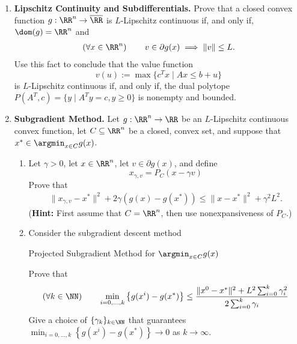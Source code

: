 \documentclass[11pt]{article}
\begin{document}
\begin{enumerate}
\begin{enumerate}
\end{enumerate}
\item \textbf{Lipschitz Continuity and Subdifferentials.} Prove that a closed convex function $g : \RR^n \rightarrow \overline{\RR}$ is $L$-Lipschitz continuous if, and only if, $\dom(g) = \RR^n$ and 
\begin{align*}
\left(\forall x \in \RR^n\right)  \qquad v \in \partial g(x) \implies \|v\| \leq L.
\end{align*}
Use this fact to conclude that the value function 
$$
v(u) := \max\{c^Tx \mid Ax \leq b + u\} 
$$
is $L$-Lipschitz continuous if, and only if, the dual polytope $P(A^T, c) = \{y \mid A^Ty = c, y \geq 0\}$ is nonempty and bounded. 
\item  \textbf{Subgradient Method.} Let $g : \RR^n \rightarrow \RR$ be an $L$-Lipschitz continuous convex function, let $C \subseteq \RR^n$ be a closed, convex set, and suppose that $x^\ast \in \argmin_{x \in C} g(x)$.
\begin{enumerate}
\item Let $\gamma > 0$, let $x \in \RR^n$, let $v \in \partial g(x)$, and define
$$
x_{\gamma, v} = P_C(x - \gamma v)
$$
Prove that 
\begin{align*}
\|x_{\gamma, v} - x^\ast\|^2 + 2\gamma(g(x) - g(x^\ast))  \leq \|x - x^\ast\|^2 + \gamma^2L^2.
\end{align*}
(\textbf{Hint:} First assume that $C = \RR^n$, then use nonexpansiveness of $P_C$.)
\item Consider the subgradient descent method
    \begin{algorithm}[H]
  \caption{Projected Subgradient Method for $\argmin_{x \in C} g(x)$
    \label{alg:altmin}}
  \begin{algorithmic}[1]
    \Loop
    \EndLoop
  \end{algorithmic}
\end{algorithm}
Prove that 
\begin{align*}
\left(\forall k \in \NN \right) \qquad \min_{i=0, \ldots, k} \left\{g(x^i) - g(x^\ast)\right\} \leq \frac{\|x^0 - x^\ast\|^2 + L^2 \sum_{i=0}^k \gamma_i^2}{2\sum_{i=0}^k\gamma_i}
\end{align*}
Give a choice of $\{\gamma_k\}_{k \in \NN}$ that guarantees  $\min_{i=0, \ldots, k} \left\{g(x^i) - g(x^\ast)\right\} \rightarrow 0$ as $k \rightarrow \infty.$
\end{enumerate}
\end{enumerate}
\end{document}
